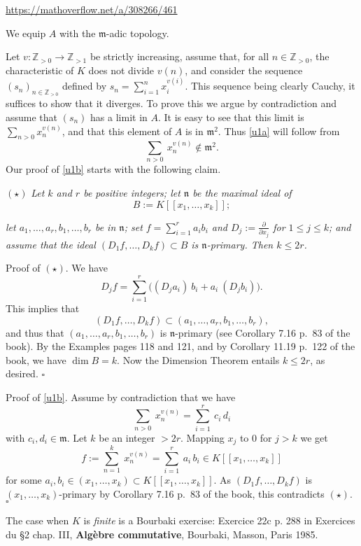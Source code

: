 \documentclass[parskip=half,fontsize=12pt]{scrartcl}%
\newcommand{\mf}{\mathfrak}
\begin{document}
\centerline{\href{https://mathoverflow.net/a/308266/461}{https://mathoverflow.net/a/308266/461}}

We equip $A$ with the $\mf m$-adic topology.

Let $v:\mathbb Z_{>0}\to\mathbb Z_{>1}$ be strictly increasing, assume that, for all $n\in\mathbb Z_{>0}$, the characteristic of $K$ does not divide $v(n)$, and consider the sequence $(s_n)_{n\in\mathbb Z_{>0}}$ defined by $s_n=\sum_{i=1}^nx_i^{v(i)}$. This sequence being clearly Cauchy, it suffices to show that it diverges. To prove this we argue by contradiction and assume that $(s_n)$ has a limit in $A$. It is easy to see that this limit is $\sum_{n>0}x_n^{v(n)}$, and that this element of $A$ is in $\mf m^2$. Thus \eqref{u1a} will follow from 
\begin{equation}\label{u1b}
\sum_{n>0}\ x_n^{v(n)}\notin\mf m^2.
\end{equation} 
Our proof of \eqref{u1b} starts with the following claim.

$(\star)$ {\em Let $k$ and $r$ be positive integers; let $\mathfrak n$ be the maximal ideal of} 
$$
B:=K[[x_1,\dots,x_k]];
$$ 

{\em let $a_1,\dots,a_r,b_1,\dots,b_r$ be in $\mathfrak n$; set $f=\sum_{i=1}^ra_ib_i$ and $D_j:=\frac{\partial}{\partial x_j}$ for $1\le j\le k$; and assume that the ideal $(D_1f,\dots,D_kf)\subset B$ is $\mathfrak n$-primary. Then $k\le2r$.}

Proof of $(\star)$. We have 
$$
D_jf=\sum_{i=1}^r\Big((D_ja_i)\ b_i+a_i\ (D_jb_i)\Big). 
$$ 
This implies that 
$$
(D_1f,\dots,D_kf)\subset(a_1,\dots,a_r,b_1,\dots,b_r),
$$ 
and thus that $(a_1,\dots,a_r,b_1,\dots,b_r)$ is $\mathfrak n$-primary (see Corollary 7.16 p.~83 of the book). By the Examples pages 118 and 121, and by Corollary 11.19 p.~122 of the book, we have $\dim B=k$. Now the Dimension Theorem entails $k\le2r$, as desired. $\square$

Proof of \eqref{u1b}. Assume by contradiction that we have 
$$
\sum_{n>0}\ x_n^{v(n)}=\sum_{i=1}^r\ c_i\,d_i
$$ 
with $c_i,d_i\in\mf m$. Let $k$ be an integer $>2r$. Mapping $x_j$ to $0$ for $j>k$ we get 
$$
f:=\sum_{n=1}^k\ x_n^{v(n)}=\sum_{i=1}^r\ a_i\,b_i\in K[[x_1,\dots,x_k]]
$$ 
for some $a_i,b_i\in(x_1,\dots,x_k)\subset K[[x_1,\dots,x_k]]$. As $(D_1f,\dots,D_kf)$ is $(x_1,\dots,x_k)$-primary by Corollary 7.16 p.~83 of the book, this contradicts $(\star)$. $\square$

The case when $K$ is \emph{finite} is a Bourbaki exercise: Exercice 22c p. 288 in Exercices du \S2 chap. III, \textbf{Algèbre commutative}, Bourbaki, Masson, Paris 1985.
\end{document}

